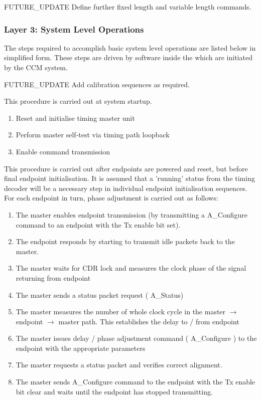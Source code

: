 \documentclass{dune}
\begin{document}
{\color{red}FUTURE\_UPDATE} Define further fixed length and variable length commands.



\subsubsection{Layer 3: System Level Operations}

The steps required to accomplish basic system level operations are listed below in simplified form. These steps are driven by software inside the  which are initiated by the CCM system.

{\color{red}FUTURE\_UPDATE} Add calibration sequences as required.


This procedure is carried out at system startup.

\begin{enumerate}
	\item Reset and initialise timing master unit
	\item Perform master self-test via timing path loopback
	\item Enable command transmission
\end{enumerate}


This procedure is carried out after endpoints are powered and reset, but before final endpoint initialisation. It is assumed that a 'running' status from the timing decoder will be a necessary step in individual endpoint initialisation sequences. For each endpoint in turn, phase adjustment is carried out as follows:

\begin{enumerate}
	\item The master enables endpoint transmission (by transmitting a A\_Configure command to an endpoint with the Tx enable bit set). 
	\item The endpoint responds by starting to transmit idle packets back to the master.
	\item The master waits for CDR lock and measures the clock phase of the signal returning from endpoint
	\item The master sends a status packet request ( A\_Status)
	\item The master measures the number of whole clock cycle in the master $\rightarrow$ endpoint $\rightarrow$ master path. This establishes the delay to / from endpoint
	\item The master issues delay / phase adjustment command ( A\_Configure ) to the endpoint with the appropriate parameters
	\item The master requests a status packet and verifies correct alignment.
	\item The master sends A\_Configure command to the endpoint with the Tx enable bit clear and waits until the endpoint has stopped transmitting.
\end{enumerate}
\end{document}
